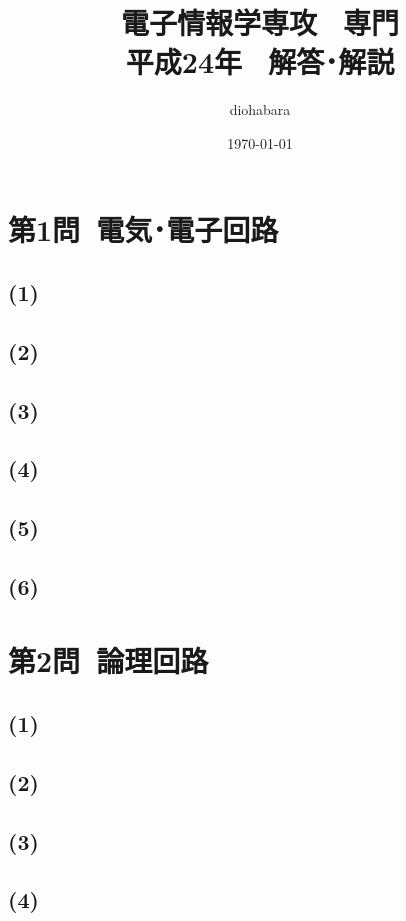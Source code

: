 \documentclass[a4paper,12pt,xelatex,ja=standard]{bxjsarticle}
\title{電子情報学専攻 \, 専門 \\ 平成24年 \, 解答･解説}
\author{diohabara}
\date{\today}
\begin{document}
\maketitle

\section*{第1問\ 電気･電子回路}
\subsection*{(1)}

\subsection*{(2)}

\subsection*{(3)}

\subsection*{(4)}

\subsection*{(5)}

\subsection*{(6)}

\section*{第2問\ 論理回路}
\subsection*{(1)}

\subsection*{(2)}

\subsection*{(3)}

\subsection*{(4)}
\end{document}
